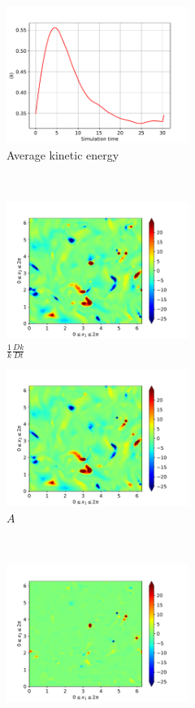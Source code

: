 \begin{figure}[H]
    \begin{subfigure}[H]{0.45\textwidth}
        \includegraphics[height=1.75in]{media/run-cds-65/ke-average1360}
        \caption{Average kinetic energy}
    \end{subfigure}
    ~
    \begin{subfigure}[H]{0.45\textwidth}
        \includegraphics[height=1.75in]{media/run-cds-65/ke-1360}
        \caption{$\frac{1}{k} \frac{D k}{Dt}$}
    \end{subfigure}
    \newline
    \begin{subfigure}{0.45\textwidth}
        \includegraphics[height=1.75in]{media/run-cds-65/A-ke-1360}
        \caption{$A$}
    \end{subfigure}
    ~
    \begin{subfigure}{0.45\textwidth}
        \includegraphics[height=1.75in]{media/run-cds-65/C-ke-1360}

\end{subfigure}
\end{figure}
